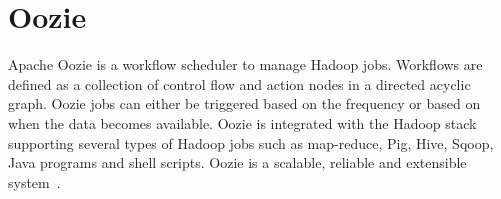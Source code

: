 \section{Oozie}
Apache Oozie is a workflow scheduler to manage Hadoop jobs. Workflows are defined as a collection of control flow and action nodes in a directed acyclic graph. Oozie  jobs can either be triggered based on the frequency or based on when the data becomes available. Oozie is integrated with the Hadoop stack supporting several types of Hadoop jobs such as map-reduce, Pig, Hive, Sqoop, Java programs and shell scripts. Oozie is a scalable, reliable and extensible system~\cite{oozie}.
